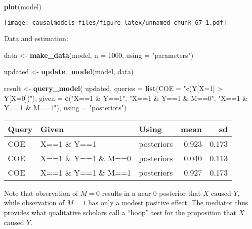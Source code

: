 \documentclass[
  12pt,
]{book}
\newenvironment{Shaded}{\begin{snugshade}}{\end{snugshade}}
\newcommand{\DataTypeTok}[1]{\textcolor[rgb]{0.13,0.29,0.53}{#1}}
\newcommand{\DecValTok}[1]{\textcolor[rgb]{0.00,0.00,0.81}{#1}}
\newcommand{\KeywordTok}[1]{\textcolor[rgb]{0.13,0.29,0.53}{\textbf{#1}}}
\newcommand{\NormalTok}[1]{#1}
\newcommand{\StringTok}[1]{\textcolor[rgb]{0.31,0.60,0.02}{#1}}
\begin{document}
\begin{Shaded}
\begin{Highlighting}[]
\KeywordTok{plot}\NormalTok{(model)}
\end{Highlighting}
\end{Shaded}

\texttt{[image: causalmodels\_files/figure-latex/unnamed-chunk-67-1.pdf]}

Data and estimation:

\begin{Shaded}
\begin{Highlighting}[]
\NormalTok{data <-}\StringTok{ }\KeywordTok{make_data}\NormalTok{(model, }\DataTypeTok{n =} \DecValTok{1000}\NormalTok{, }\DataTypeTok{using =} \StringTok{"parameters"}\NormalTok{)}
\end{Highlighting}
\end{Shaded}

\begin{Shaded}
\begin{Highlighting}[]
\NormalTok{updated <-}\StringTok{ }\KeywordTok{update_model}\NormalTok{(model, data)}
\end{Highlighting}
\end{Shaded}

\begin{Shaded}
\begin{Highlighting}[]
\NormalTok{result <-}\StringTok{ }\KeywordTok{query_model}\NormalTok{(}
\NormalTok{    updated, }
    \DataTypeTok{queries =} \KeywordTok{list}\NormalTok{(}\DataTypeTok{COE =} \StringTok{"c(Y[X=1] > Y[X=0])"}\NormalTok{), }
    \DataTypeTok{given =} \KeywordTok{c}\NormalTok{(}\StringTok{"X==1 & Y==1"}\NormalTok{, }\StringTok{"X==1 & Y==1 & M==0"}\NormalTok{, }\StringTok{"X==1 & Y==1 & M==1"}\NormalTok{),}
    \DataTypeTok{using =} \StringTok{"posteriors"}\NormalTok{)}
\end{Highlighting}
\end{Shaded}

\begin{tabular}{l|l|l|r|r}
\hline
Query & Given & Using & mean & sd\\
\hline
COE & X==1 \& Y==1 & posteriors & 0.923 & 0.173\\
\hline
COE & X==1 \& Y==1 \& M==0 & posteriors & 0.040 & 0.113\\
\hline
COE & X==1 \& Y==1 \& M==1 & posteriors & 0.927 & 0.173\\
\hline
\end{tabular}

Note that observation of \(M=0\) results in a near 0 posterior that \(X\) caused \(Y\), while observation of \(M=1\) has only a modest positive effect. The mediator thus provides what qualitative scholars call a ``hoop'' test for the proposition that \(X\) caused \(Y\).
\end{document}
